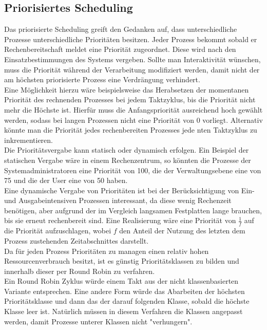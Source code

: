 \subsection{Priorisiertes Scheduling}
Das priorisierte Scheduling greift den Gedanken auf, dass unterschiedliche Prozesse unterschiedliche 
Prioritäten besitzen. Jeder Prozess bekommt sobald er Rechenbereitschaft meldet eine Priorität zugeordnet.
Diese wird nach den Einsatzbestimmungen des Systems vergeben. Sollte man Interaktivität wünschen, muss die 
Priorität während der Verarbeitung modifiziert werden, damit nicht der am höchsten priorisierte Prozess 
eine Verdrängung verhindert. \\
Eine Möglichkeit hierzu wäre beispielsweise das Herabsetzen der momentanen Priorität des rechnenden 
Prozesses bei jedem Taktzyklus, bis die Priorität nicht mehr die Höchste ist. Hierfür muss die 
Anfangspriorität ausreichend hoch gewählt werden, sodass bei langen Prozessen nicht eine Priorität von 0 
vorliegt. Alternativ könnte man die Priorität jedes rechenbereiten Prozesses jede nten Taktzyklus zu 
inkrementieren. \\
Die Prioritätsvergabe kann statisch oder dynamisch erfolgen. Ein Beispiel der statischen Vergabe wäre in 
einem Rechenzentrum, so könnten die Prozesse der Systemadministratoren eine Priorität von 100, die der 
Verwaltungsebene eine von 75 und die der User eine von 50 haben. \\
Eine dynamische Vergabe von Prioritäten ist bei der Berücksichtigung von Ein- und Ausgabeintensiven 
Prozessen interessant, da diese wenig Rechenzeit benötigen, aber aufgrund der im Vergleich langsamen 
Festplatten lange brauchen, bis sie erneut rechenbereit sind. Eine Realisierung wäre eine Priorität von 
\(\frac{1}{f}\) auf die Priorität aufzuschlagen, wobei \(f\) den Anteil der Nutzung des letzten dem Prozess 
zustehenden Zeitabschnittes darstellt. \\
Da für jeden Prozess Prioritäten zu managen einen relativ hohen Ressourcenverbrauch besitzt, ist es günstig 
Prioritätsklassen zu bilden und innerhalb dieser per Round Robin zu verfahren. \cite{OSThreePieces2014} \\
Ein Round Robin Zyklus würde einem Takt aus der nicht klassenbasierten Variante entsprechen. Eine andere 
Form würde das Abarbeiten der höchsten Prioritätsklasse und dann das der darauf folgenden Klasse, sobald 
die höchste Klasse leer ist. Natürlich müssen in diesem Verfahren die Klassen angepasst werden, damit 
Prozesse unterer Klassen nicht "verhungern". \cite{tanenb2009}


